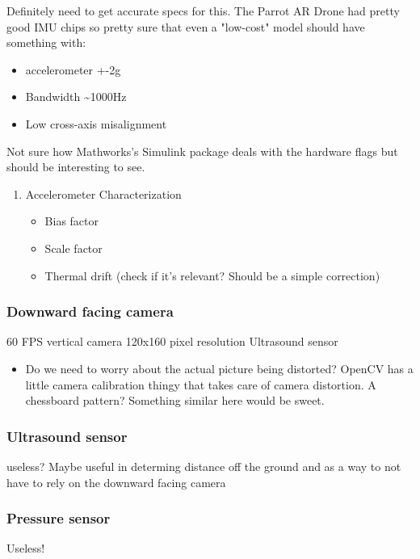 \documentclass[unrestricted]{meetingnotesminutes}
\begin{document}
Definitely need to get accurate specs for this.
The Parrot AR Drone had pretty good IMU chips so pretty sure that even a "low-cost" model should have something with:
\begin{itemize}
\item accelerometer +-2g
\item Bandwidth \textasciitilde{}1000Hz
\item Low cross-axis misalignment
\end{itemize}

Not sure how Mathworks's Simulink package deals with the hardware flags but should be interesting to see.

\begin{enumerate}
\item Accelerometer Characterization
\label{sec:org9d2370d}
\begin{itemize}
\item Bias factor
\item Scale factor
\item Thermal drift (check if it's relevant? Should be a simple correction)
\end{itemize}
\end{enumerate}

\subsubsection{Downward facing camera}
\label{sec:org8430003}

60 FPS vertical camera
120x160 pixel resolution
Ultrasound sensor

\begin{itemize}
\item Do we need to worry about the actual picture being distorted?
OpenCV has a little camera calibration thingy that takes care of camera distortion.
A chessboard pattern? Something similar here would be sweet.
\end{itemize}



\subsubsection{Ultrasound sensor}
\label{sec:org51a920c}
useless? Maybe useful in determing distance off the ground and as a way to not have to rely on the downward facing camera
\subsubsection{Pressure sensor}
\label{sec:orgff6fee5}
Useless!
\end{document}
